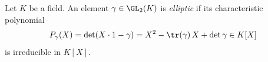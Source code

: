 Let $K$ be a field. An element $\gamma\in\GL_2(K)$ is \emph{elliptic} if its characteristic polynomial
\[
  P_\gamma(X)=\det(X\cdot1-\gamma)=X^2-\tr(\gamma)\,X+\det\gamma\in K[X]
\]
is irreducible in $K[X]$.
